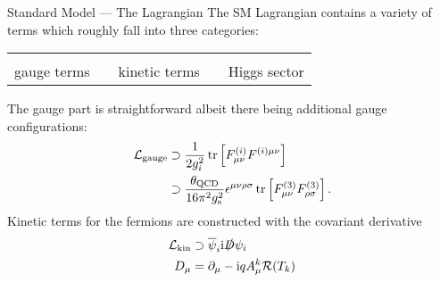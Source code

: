 \begin{frame}{Standard Model — The Lagrangian}
The SM Lagrangian contains a variety of terms which roughly fall into three categories:
\begin{table}
\begin{tabular}{ccccc}&&&&\\
  gauge terms&& kinetic terms&& Higgs sector
\end{tabular}
\end{table}

The gauge part is straightforward albeit there being additional gauge configurations:
\begin{align}
  \mathcal{L}_\text{gauge}&\supset\frac1{2g_i^2}\tr\left[F^{(i)}_{\mu\nu}F^{(i)\mu\nu}\right]\\
  &\supset\frac{\theta_\mathrm{QCD}}{16\pi^2g_\mathrm{s}^2}\epsilon^{\mu\nu\rho\sigma}\tr\left[F^{(3)}_{\mu\nu}F^{(3)}_{\rho\sigma}\right].
\end{align}
Kinetic terms for the fermions are constructed with the covariant derivative
\begin{align}
  \mathcal{L}_\mathrm{kin}&\supset\overline{\psi}_i\mathrm{i}\slashed{D}\psi_i\\
  D_\mu&=\partial_\mu-\mathrm{i} qA^k_\mu\mathcal{R}(T_k)
\end{align}
\end{frame}

